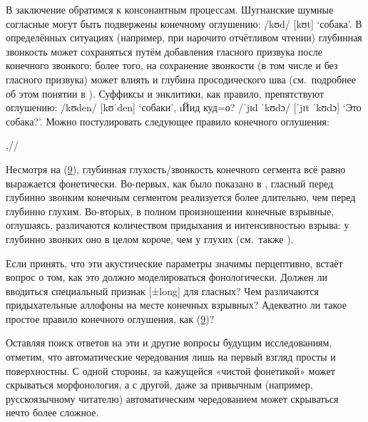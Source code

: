 В заключение обратимся к консонантным процессам. Шугнанские шумные согласные могут быть подвержены конечному оглушению: /kʊd/ [kʊt] ‘собака’. В определённых ситуациях (например, при нарочито отчётливом чтении) глубинная звонкость может сохраняться путём добавления гласного призвука после конечного звонкого; более того, на сохранение звонкости (в том числе и без гласного призвука) может влиять и глубина просодического шва (см.~подробнее об этом понятии в \parencite{krivnova2015}). Суффиксы и энклитики, как правило, препятствуют оглушению: /kʊden/ [kʊˈden] ‘собаки’, \i{Йид куд=о?} /ˈjɪd ˈkʊdɔ/ [ˈjɪt ˈkʊdɔ] ‘Это собака?’. Можно постулировать следующее правило конечного оглушения:

\ex[exno=9] \begingl[everygla=] \label{exmorphon9}
\gla {},//
\endgl \xe

Несмотря на (\hyperref[exmorphon9]{9}), глубинная глухость/звонкость конечного сегмента всё равно выражается фонетически. Во-первых, как было показано в \parencite{makarov2022_plosives}, гласный перед глубинно звонким конечным сегментом реализуется более длительно, чем перед глубинно глухим. Во-вторых, в полном произношении конечные взрывные, оглушаясь, различаются количеством придыхания и интенсивностью взрыва: у глубинно звонких оно в целом короче, чем у глухих (см.~также \parencite{makarov2023_aspiration}).

Если принять, что эти акустические параметры значимы перцептивно, встаёт вопрос о том, как это должно моделироваться фонологически. Должен ли вводиться специальный признак [±long] для гласных? Чем различаются придыхательные аллофоны на месте конечных взрывных? Адекватно ли такое простое правило конечного оглушения, как (\hyperref[exmorphon9]{9})?

Оставляя поиск ответов на эти и другие вопросы будущим исследованиям, отметим, что автоматические чередования лишь на первый взгляд просты и поверхностны. С одной стороны, за кажущейся «чистой фонетикой» может скрываться морфонология, а с другой, даже за привычным (например, русскоязычному читателю) автоматическим чередованием может скрываться нечто более сложное.